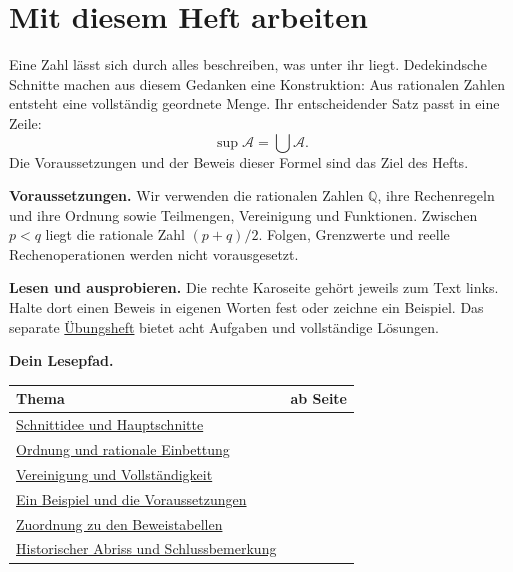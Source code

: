 \section*{Mit diesem Heft arbeiten}

Eine Zahl lässt sich durch alles beschreiben, was unter ihr liegt.
Dedekindsche Schnitte machen aus diesem Gedanken eine Konstruktion:
Aus rationalen Zahlen entsteht eine vollständig geordnete Menge.
Ihr entscheidender Satz passt in eine Zeile:
\[
 \boxed{\sup\mathcal A=\bigcup\mathcal A.}
\]
Die Voraussetzungen und der Beweis dieser Formel sind das Ziel des Hefts.

\textbf{Voraussetzungen.}
Wir verwenden die rationalen Zahlen $\mathbb Q$, ihre Rechenregeln
und ihre Ordnung sowie Teilmengen, Vereinigung und Funktionen.
Zwischen $p<q$ liegt die rationale Zahl $(p+q)/2$.
Folgen, Grenzwerte und reelle Rechenoperationen werden nicht vorausgesetzt.

\textbf{Lesen und ausprobieren.}
Die rechte Karoseite gehört jeweils zum Text links. Halte dort einen
Beweis in eigenen Worten fest oder zeichne ein Beispiel.
Das separate \href{_B19-cuts-exercises.pdf\#cuts.exercises}{Übungsheft} bietet acht Aufgaben und vollständige Lösungen.

\textbf{Dein Lesepfad.}
\begin{center}
\renewcommand{\arraystretch}{1.16}
\begin{tabularx}{\linewidth}{@{}Xr@{}}
\toprule
Thema & ab Seite\\
\midrule
\hyperref[cuts:idea]{Schnittidee und Hauptschnitte} & \pageref{cuts:idea}\\
\hyperref[cuts:order]{Ordnung und rationale Einbettung} & \pageref{cuts:order}\\
\hyperref[cuts:supremum]{Vereinigung und Vollständigkeit} & \pageref{cuts:supremum}\\
\hyperref[cuts:example]{Ein Beispiel und die Voraussetzungen} & \pageref{cuts:example}\\
\hyperref[cuts:correspondence]{Zuordnung zu den Beweistabellen} & \pageref{cuts:correspondence}\\
\hyperref[cuts:history]{Historischer Abriss und Schlussbemerkung} & \pageref{cuts:history}\\
\bottomrule
\end{tabularx}
\end{center}

